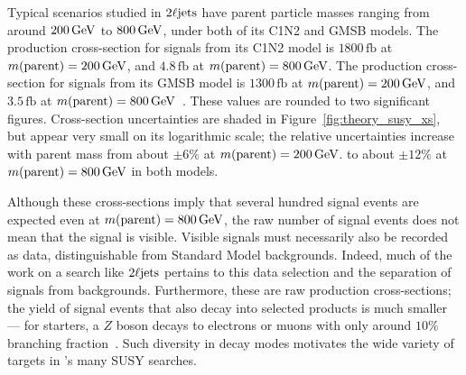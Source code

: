 Typical scenarios studied in $\twoljets$ have parent particle masses ranging
from around $200\,\eV[G]$ to $800\,\eV[G]$, under both of its C1N2 and GMSB
models.
The production cross-section for signals from its C1N2 model is
$1800\,\mathrm{fb}$ at $m(\mathrm{parent}) = 200\,\eV[G]$,
and $4.8\,\mathrm{fb}$ at $m(\mathrm{parent}) = 800\,\eV[G]$.
The production cross-section for signals from its GMSB model is
$1300\,\mathrm{fb}$ at $m(\mathrm{parent}) = 200\,\eV[G]$,
and $3.5\,\mathrm{fb}$ at $m(\mathrm{parent}) = 800\,\eV[G]$~\cite{
Fuks:2012qx,Fuks:2013vua}.
These values are rounded to two significant figures.
Cross-section uncertainties are shaded in  Figure~\ref{fig:theory_susy_xs},
but appear very small on its logarithmic scale;
the relative uncertainties increase with parent mass from about
$\pm 6\%$ at $m(\mathrm{parent}) = 200\,\eV[G]$.
to about
$\pm 12\%$ at $m(\mathrm{parent}) = 800\,\eV[G]$
in both models.

Although these cross-sections imply that several hundred signal events are
expected even at $m(\mathrm{parent}) = 800\,\eV[G]$, the raw number of signal
events does not mean that the signal is visible.
Visible signals must necessarily also be recorded as data,
distinguishable from Standard Model backgrounds.
Indeed, much of the work on a search like $\twoljets$ pertains to this
data selection and the separation of signals from backgrounds.
Furthermore, these are raw production cross-sections;
the yield of signal events that also decay into selected products is much
smaller ---
for starters, a $Z$ boson decays to electrons or muons with only around
$10\%$ branching fraction~\cite{pdg2022ynf}.
Such diversity in decay modes motivates the wide variety of targets in
\atlas's many SUSY searches.


